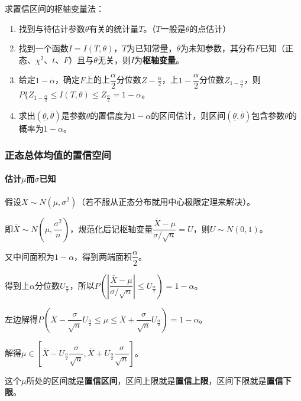 \documentclass[UTF8, 12pt]{ctexart}
\begin{document}
求置信区间的枢轴变量法：

\begin{enumerate}
    \item 找到与待估计参数$\theta$有关的统计量$T$。（$T$一般是$\theta$的点估计）
    \item 找到一个函数$I=I(T,\theta)$，$T$为已知常量，$\theta$为未知参数，其分布$F$已知（正态、$\chi^2$、$t$、$F$）且与$\theta$无关，则$I$为\textbf{枢轴变量}。
    \item 给定$1-\alpha$，确定$F$上的上$\dfrac{\alpha}{2}$分位数$Z-{\frac{\alpha}{2}}$，上$1-\dfrac{\alpha}{2}$分位数$Z_{1-\frac{\alpha}{2}}$，则$P\{Z_{1-\frac{\alpha}{2}}\leqslant I(T,\theta)\leqslant Z_{\frac{\alpha}{2}}=1-\alpha$。
    \item 求出$(\underline{\theta},\overline{\theta})$是参数$\theta$的置信度为$1-\alpha$的区间估计，则区间$(\underline{\theta},\overline{\theta})$包含参数$\theta$的概率为$1-\alpha$。
\end{enumerate}

\subsubsection{正态总体均值的置信空间}

\paragraph{\texorpdfstring{估计$\mu$而$\sigma$已知}{}} \leavevmode \medskip

假设$X\sim N(\mu,\sigma^2)$（若不服从正态分布就用中心极限定理来解决）。

即$\overline{X}\sim N\left(\mu,\dfrac{\sigma^2}{n}\right)$，规范化后记枢轴变量$\dfrac{\overline{X}-\mu}{\sigma/\sqrt{n}}=U$，则$U\sim N(0,1)$。

又中间面积为$1-\alpha$，得到两端面积$\dfrac{\alpha}{2}$。

得到上$\alpha$分位数$U_\frac{\alpha}{2}$，所以$P\left(\left\vert\dfrac{\overline{X}-\mu}{\sigma/\sqrt{n}}\right\vert\leqslant U_\frac{\alpha}{2}\right)=1-\alpha$。

左边解得$P\left(\overline{X}-\dfrac{\sigma}{\sqrt{n}}U_\frac{\alpha}{2}\leqslant\mu\leqslant\overline{X}+\dfrac{\sigma}{\sqrt{n}}U_\frac{\alpha}{2}\right)=1-\alpha$。

解得$\mu\in[\overline{X}-U_\frac{\alpha}{2}\dfrac{\sigma}{\sqrt{n}},\overline{X}+U_\frac{\alpha}{2}\dfrac{\sigma}{\sqrt{n}}]$。

这个$\mu$所处的区间就是\textbf{置信区间}，区间上限就是\textbf{置信上限}，区间下限就是\textbf{置信下限}。
\end{document}

